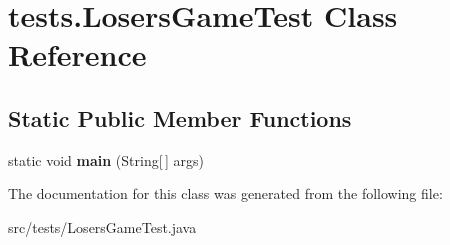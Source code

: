 \hypertarget{classtests_1_1_losers_game_test}{\section{tests.\-Losers\-Game\-Test Class Reference}
\label{classtests_1_1_losers_game_test}
}
\subsection*{Static Public Member Functions}
\begin{DoxyCompactItemize}
\item 
\hypertarget{classtests_1_1_losers_game_test_aedf2329fa598807bd67912d947bc5b3a}{static void {\bfseries main} (String\mbox{[}$\,$\mbox{]} args)}\label{classtests_1_1_losers_game_test_aedf2329fa598807bd67912d947bc5b3a}

\end{DoxyCompactItemize}


The documentation for this class was generated from the following file\-:\begin{DoxyCompactItemize}
\item 
src/tests/Losers\-Game\-Test.\-java\end{DoxyCompactItemize}
